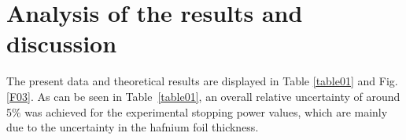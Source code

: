 \documentclass[aps,prb,reprint,groupedaddress]{revtex4-1}
\begin{document}
\section{Analysis of the results and discussion}
\label{discussion}

The present data and theoretical results are displayed in Table \ref{table01} and Fig. \ref{F03}. As can be seen in Table~\ref{table01}, an overall relative uncertainty of around 5$\%$ was achieved for the experimental stopping power values, which are mainly due to the uncertainty in the hafnium foil thickness. %
\end{document}
